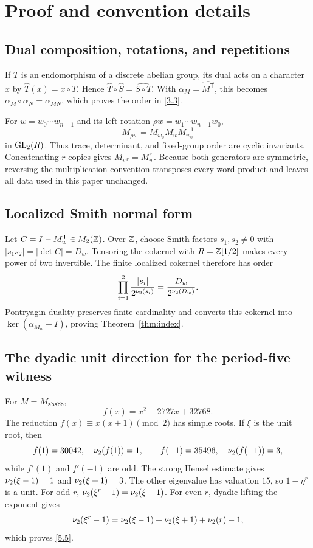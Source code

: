 \section{Proof and convention details}
\label{app:proofs}

\subsection{Dual composition, rotations, and repetitions}

If \(T\) is an endomorphism of a discrete abelian group, its dual acts on a
character \(x\) by \(\widehat T(x)=x\circ T\).  Hence
\(\widehat T\circ\widehat S=\widehat{S\circ T}\).  With
\(\alpha_M=\widehat{M^{\mathsf T}}\), this becomes
\(\alpha_M\circ\alpha_N=\alpha_{MN}\), which proves the order in
\eqref{3.3}.

For \(w=w_0\cdots w_{n-1}\) and its left rotation
\(\rho w=w_1\cdots w_{n-1}w_0\),
\[
 M_{\rho w}=M_{w_0}M_wM_{w_0}^{-1}
\]
in \(\operatorname{GL}_2(R)\).  Thus trace, determinant, and fixed-group order are cyclic
invariants.  Concatenating \(r\) copies gives \(M_{w^r}=M_w^r\).  Because
both generators are symmetric, reversing the multiplication convention
transposes every word product and leaves all data used in this paper
unchanged.

\subsection{Localized Smith normal form}

Let \(C=I-M_w^{\mathsf T}\in M_2(\mathbb{Z})\).  Over \(\mathbb{Z}\), choose Smith factors
\(s_1,s_2\ne0\) with \(|s_1s_2|=|\det C|=D_w\).  Tensoring the cokernel with
\(R=\mathbb{Z}[1/2]\) makes every power of two invertible.  The finite localized
cokernel therefore has order
\[
 \prod_{i=1}^2\frac{|s_i|}{2^{\nu_2(s_i)}}
 =\frac{D_w}{2^{\nu_2(D_w)}}.
\]
Pontryagin duality preserves finite cardinality and converts this cokernel
into \(\ker(\alpha_{M_w}-I)\), proving Theorem~\ref{thm:index}.

\subsection{The dyadic unit direction for the period-five witness}

For \(M=M_{\texttt{ababb}}\),
\[
 f(x)=x^2-2727x+32768.
\]
The reduction \(f(x)\equiv x(x+1)\pmod2\) has simple roots.  If \(\xi\) is
the unit root, then
\[
 f(1)=30042,\quad \nu_2(f(1))=1,\qquad
 f(-1)=35496,\quad \nu_2(f(-1))=3,
\]
while \(f'(1)\) and \(f'(-1)\) are odd.  The strong Hensel estimate gives
\(\nu_2(\xi-1)=1\) and \(\nu_2(\xi+1)=3\).  The other eigenvalue has
valuation \(15\), so \(1-\eta^r\) is a unit.  For odd \(r\),
\(\nu_2(\xi^r-1)=\nu_2(\xi-1)\).  For even \(r\), dyadic
lifting-the-exponent gives
\[
 \nu_2(\xi^r-1)
 =\nu_2(\xi-1)+\nu_2(\xi+1)+\nu_2(r)-1,
\]
which proves \eqref{5.5}.

